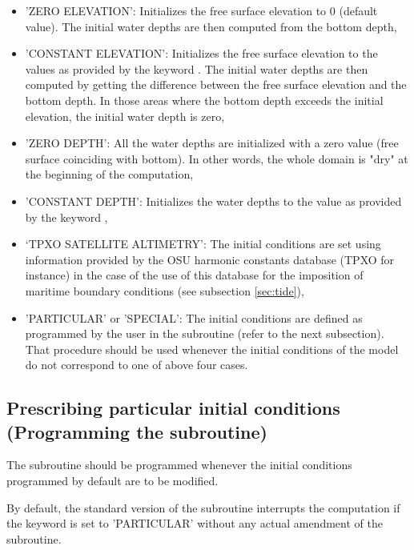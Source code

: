 \begin{itemize}
\item 'ZERO ELEVATION': Initializes the free surface elevation
to 0 (default value). The initial water depths are then computed from the
bottom depth,

\item 'CONSTANT ELEVATION': Initializes the free surface elevation to the
values as provided by the keyword . The initial water
depths are then computed by getting the difference between the free surface
elevation and the bottom depth.  In those areas where the bottom depth exceeds
the initial elevation, the initial water depth is zero,

\item 'ZERO DEPTH': All the water depths are initialized with a zero value
(free surface coinciding with bottom). In other words, the whole domain is
"dry" at the beginning of the computation,

\item 'CONSTANT DEPTH': Initializes the water depths to the value as provided
by the keyword ,

\item `TPXO SATELLITE ALTIMETRY': The initial conditions are set using
information provided by the OSU harmonic constants database (TPXO for instance)
in the case of the use of this database for the imposition of maritime boundary
conditions (see subsection \ref{sec:tide}),

\item 'PARTICULAR' or 'SPECIAL': The initial conditions are defined as
programmed by the user in the  subroutine (refer to the next
subsection).
That procedure should be used whenever the initial conditions of the model do 
not correspond to one of above four cases.
\end{itemize}


\subsection{Prescribing particular initial conditions (Programming the  subroutine)}
\label{sec:prescr_IC}

The  subroutine should be programmed whenever the initial
conditions programmed by default are to be modified.

By default, the standard version of the  subroutine interrupts
the computation if the keyword  is set to 'PARTICULAR'
without any actual amendment of the subroutine.

